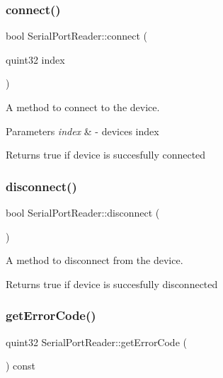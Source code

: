 \subsubsection{\texorpdfstring{connect()}{connect()}}
{\footnotesize\ttfamily bool Serial\+Port\+Reader\+::connect (\begin{DoxyParamCaption}\item[{quint32}]{index }\end{DoxyParamCaption})}



A method to connect to the device. 


\begin{DoxyParams}{Parameters}
{\em index} & -\/ device\textquotesingle{}s index \\
\hline
\end{DoxyParams}
\begin{DoxyReturn}{Returns}
true if device is succesfully connected 
\end{DoxyReturn}
\mbox{\label{class_serial_port_reader_a40d30745fd700e05d534b38c4ba4939b}} 
\subsubsection{\texorpdfstring{disconnect()}{disconnect()}}
{\footnotesize\ttfamily bool Serial\+Port\+Reader\+::disconnect (\begin{DoxyParamCaption}{ }\end{DoxyParamCaption})}



A method to disconnect from the device. 

\begin{DoxyReturn}{Returns}
true if device is succesfully disconnected 
\end{DoxyReturn}
\mbox{\label{class_serial_port_reader_a33a6f505ebf902bf3a3f64970c6a7cec}} 
\subsubsection{\texorpdfstring{get\+Error\+Code()}{getErrorCode()}}
{\footnotesize\ttfamily quint32 Serial\+Port\+Reader\+::get\+Error\+Code (\begin{DoxyParamCaption}{ }\end{DoxyParamCaption}) const}



